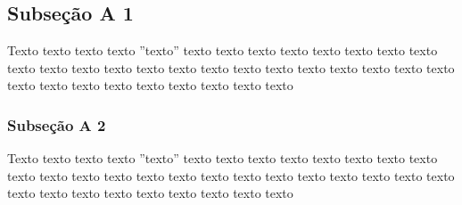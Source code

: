 \subsection{Subseção A 1}
\label{sub:outrasubsection2}

Texto texto texto texto ''texto'' texto texto texto texto texto texto texto texto texto texto texto texto texto texto texto texto texto texto texto texto texto texto texto texto texto texto texto texto texto texto texto


\subsubsection{Subseção A 2}
\label{subsub:outrasubsubsection2}

Texto texto texto texto ''texto'' texto texto texto texto texto texto texto texto texto texto texto texto texto texto texto texto texto texto texto texto texto texto texto texto texto texto texto texto texto texto texto
